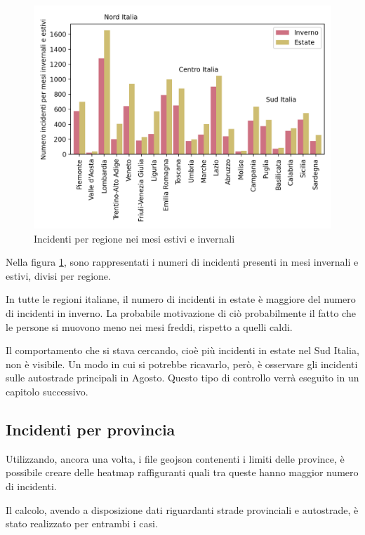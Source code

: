 \documentclass[a4paper]{report}
\begin{document}
\begin{figure}
    \includegraphics[width=\linewidth]{../src/incidenti/incidenti_aci/mappe_regioni/estate_inverno.png}
    \caption{Incidenti per regione nei mesi estivi e invernali}
    \label{fig:estate-inverno}
\end{figure}

Nella figura \ref{fig:estate-inverno}, sono rappresentati i numeri di incidenti presenti 
in mesi invernali e estivi, divisi per regione.

In tutte le regioni italiane, il numero di incidenti in estate è maggiore del 
numero di incidenti in inverno. 
La probabile motivazione di ciò probabilmente il fatto che 
le persone si muovono meno nei mesi freddi, rispetto a quelli caldi.

Il comportamento che si stava cercando, cioè più incidenti in estate nel 
Sud Italia, non è visibile. 
Un modo in cui si potrebbe ricavarlo, però, è osservare gli incidenti sulle autostrade 
principali in Agosto.
Questo tipo di controllo verrà eseguito in un capitolo successivo.


\subsection{Incidenti per provincia}

Utilizzando, ancora una volta, i file geojson contenenti i limiti delle province, è 
possibile creare delle heatmap raffiguranti quali tra queste hanno maggior numero 
di incidenti.

Il calcolo, avendo a disposizione dati riguardanti strade provinciali e autostrade, 
è stato realizzato per entrambi i casi.
\end{document}
